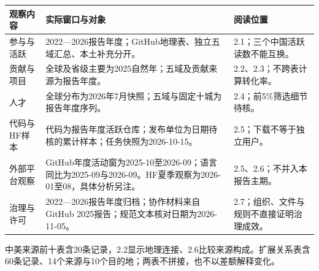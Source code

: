 \begingroup\sffamily\fontsize{10.3}{15.4}\selectfont\setlength{\tabcolsep}{4pt}\renewcommand{\arraystretch}{1.45}
\noindent\begin{tabularx}{\linewidth}{@{}p{26mm}X p{53mm}@{}}\toprule
观察内容 & 实际窗口与对象 & 阅读位置\\\midrule
参与与活跃 & 2022—2026报告年度；GitHub地理表、独立五域汇总、本土补充分开。 & 2.1；三个中国活跃读数不能互换。\\\addlinespace[5pt]
贡献与项目 & 全球及省级主要为2025自然年；五域及贡献来源为报告年度。 & 2.2、2.3；不跨表计算转化率。\\\addlinespace[5pt]
人才 & 全球分布为2026年7月快照；五域与固定十城为报告年度序列。 & 2.4；前5\%筛选细节待核。\\\addlinespace[5pt]
代码与HF样本 & 代码为报告年度活跃仓库；发布单位为日期待核的累计样本；任务快照为2026-10-15。 & 2.5；下载不等于独立用户。\\\addlinespace[5pt]
外部平台观察 & GitHub年度活动窗为2025-10至2026-09；语言同比为2025-09与2026-09。HF夏季观察为2026-01至08，具体分析另注。 & 2.5、2.6；不并入本报告主期。\\\addlinespace[5pt]
治理与许可 & 2022—2026报告年度归档；协作材料来自GitHub 2025报告；规范文本核对日期为2026-11-05。 & 2.7；组织、文件与规则不直接证明治理成效。\\\bottomrule
\end{tabularx}\endgroup
{}
中美来源前十表含20条记录，2.2显示地理连接、2.6比较来源构成。扩展关系表含60条记录、14个来源与10个目的地；两表不拼接，也不以差额解释变化。
\vfill{}
\clearpage
